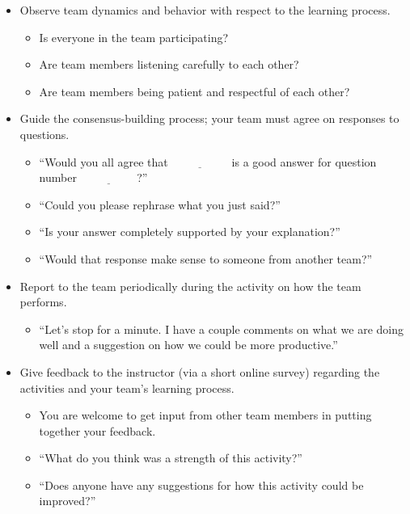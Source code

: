 \documentclass[12pt]{article}
\newcommand{\blank}{\ensuremath{\underline{\phantom{XXXXXX}}}\xspace}
\begin{document}
\begin{itemize}
\item Observe team dynamics and behavior with respect to the learning process.
  \begin{itemize}
  \item Is everyone in the team participating?
  \item Are team members listening carefully to each other?
  \item Are team members being patient and respectful of each other?
  \end{itemize}
\item Guide the consensus-building process; your team must agree on
  responses to questions.
  \begin{itemize}
  \item ``Would you all agree that \blank is a good answer for
    question number \blank?''
  \item ``Could you please rephrase what you just said?''
  \item ``Is your answer completely supported by your explanation?''
  \item ``Would that response make sense to someone from another
    team?''
  \end{itemize}
\item Report to the team periodically during the activity on how the
  team performs.
  \begin{itemize}
  \item ``Let's stop for a minute. I have a couple comments on what we
    are doing well and a suggestion on how we could be more
    productive.''
  \end{itemize}
\item Give feedback to the instructor (via a short online survey)
  regarding the activities and your team's learning process.
  \begin{itemize}
  \item You are welcome to get input from other team members in
    putting together your feedback.
  \item ``What do you think was a strength of this activity?''
  \item ``Does anyone have any suggestions for how this activity could
    be improved?''
  \end{itemize}
\end{itemize}
\end{document}

